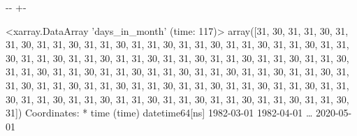 \documentclass[letterpaper,10pt,english]{sphinxmanual}
\newlength\nbsphinxcodecellspacing
\begin{document}
{

\kern-\sphinxverbatimsmallskipamount\kern-\baselineskip
\kern+\FrameHeightAdjust\kern-\fboxrule
\vspace{\nbsphinxcodecellspacing}

\begin{sphinxVerbatim}[commandchars=\\\{\}]
\llap{\color{nbsphinxout}[14]:\,\hspace{\fboxrule}\hspace{\fboxsep}}<xarray.DataArray 'days\_in\_month' (time: 117)>
array([31, 30, 31, 31, 30, 31, 31, 30, 31, 31, 30, 31, 31, 30, 31, 31, 30,
       31, 31, 30, 31, 31, 30, 31, 31, 30, 31, 31, 30, 31, 31, 30, 31, 31,
       30, 31, 31, 30, 31, 31, 30, 31, 31, 30, 31, 31, 30, 31, 31, 30, 31,
       31, 30, 31, 31, 30, 31, 31, 30, 31, 31, 30, 31, 31, 30, 31, 31, 30,
       31, 31, 30, 31, 31, 30, 31, 31, 30, 31, 31, 30, 31, 31, 30, 31, 31,
       30, 31, 31, 30, 31, 31, 30, 31, 31, 30, 31, 31, 30, 31, 31, 30, 31,
       31, 30, 31, 31, 30, 31, 31, 30, 31, 31, 30, 31, 31, 30, 31])
Coordinates:
  * time     (time) datetime64[ns] 1982-03-01 1982-04-01 {\ldots} 2020-05-01
\end{sphinxVerbatim}
}

{
\begin{sphinxVerbatim}[commandchars=\\\{\}]
\llap{\color{nbsphinxin}[15]:\,\hspace{\fboxrule}\hspace{\fboxsep}}
    
\end{sphinxVerbatim}
}
\end{document}
